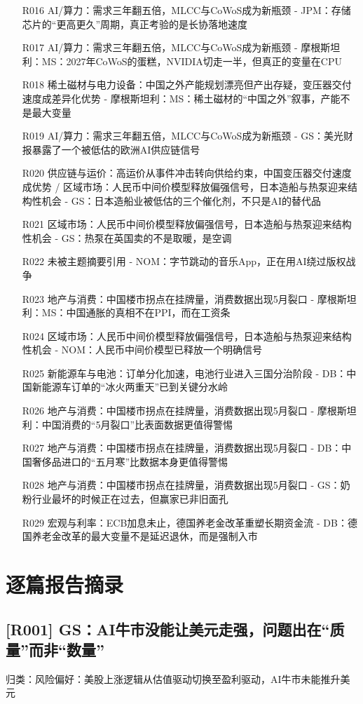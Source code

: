 \documentclass[11pt]{ctexart}
\begin{document}
\begin{itemize}
  \item [R016] AI/算力：需求三年翻五倍，MLCC与CoWoS成为新瓶颈 - JPM：存储芯片的“更高更久”周期，真正考验的是长协落地速度
  \item [R017] AI/算力：需求三年翻五倍，MLCC与CoWoS成为新瓶颈 - 摩根斯坦利：MS：2027年CoWoS的蛋糕，NVIDIA切走一半，但真正的变量在CPU
  \item [R018] 稀土磁材与电力设备：中国之外产能规划漂亮但产出存疑，变压器交付速度成差异化优势 - 摩根斯坦利：MS：稀土磁材的“中国之外”叙事，产能不是最大变量
  \item [R019] AI/算力：需求三年翻五倍，MLCC与CoWoS成为新瓶颈 - GS：美光财报暴露了一个被低估的欧洲AI供应链信号
  \item [R020] 供应链与运价：高运价从事件冲击转向供给约束，中国变压器交付速度成优势 / 区域市场：人民币中间价模型释放偏强信号，日本造船与热泵迎来结构性机会 - GS：日本造船业被低估的三个催化剂，不只是AI的替代品
  \item [R021] 区域市场：人民币中间价模型释放偏强信号，日本造船与热泵迎来结构性机会 - GS：热泵在英国卖的不是取暖，是空调
  \item [R022] 未被主题摘要引用 - NOM：字节跳动的音乐App，正在用AI绕过版权战争
  \item [R023] 地产与消费：中国楼市拐点在挂牌量，消费数据出现5月裂口 - 摩根斯坦利：MS：中国通胀的真相不在PPI，而在工资条
  \item [R024] 区域市场：人民币中间价模型释放偏强信号，日本造船与热泵迎来结构性机会 - NOM：人民币中间价模型已释放一个明确信号
  \item [R025] 新能源车与电池：订单分化加速，电池行业进入三国分治阶段 - DB：中国新能源车订单的“冰火两重天”已到关键分水岭
  \item [R026] 地产与消费：中国楼市拐点在挂牌量，消费数据出现5月裂口 - 摩根斯坦利：中国消费的“5月裂口”比表面数据更值得警惕
  \item [R027] 地产与消费：中国楼市拐点在挂牌量，消费数据出现5月裂口 - DB：中国奢侈品进口的“五月寒”比数据本身更值得警惕
  \item [R028] 地产与消费：中国楼市拐点在挂牌量，消费数据出现5月裂口 - GS：奶粉行业最坏的时候正在过去，但赢家已非旧面孔
  \item [R029] 宏观与利率：ECB加息未止，德国养老金改革重塑长期资金流 - DB：德国养老金改革的最大变量不是延迟退休，而是强制入市
\end{itemize}
\section{逐篇报告摘录}
\subsection{[R001] GS：AI牛市没能让美元走强，问题出在“质量”而非“数量”}
{\small\color{refgray}归类：风险偏好：美股上涨逻辑从估值驱动切换至盈利驱动，AI牛市未能推升美元}
\end{document}
